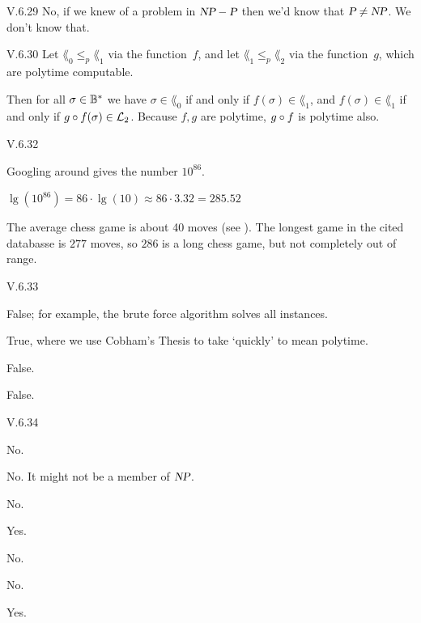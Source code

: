 %
\begin{ans}{V.6.29}
No, if we knew of a problem in $\textsl{NP}-\textsl{P}$ then we'd know that $\textsl{P}\neq\textsl{NP}$.
We don't know that.
\end{ans}
%
\begin{ans}{V.6.30}
Let $\lang_0\leq_p\lang_1$ via the function~$f$,
and let $\lang_1\leq_p\lang_2$ via the function~$g$,
which are polytime computable.

Then for all $\sigma\in{{\mathbb{B}}^{*}}$ we have
$\sigma\in\lang_0$ if and only if $f(\sigma)\in\lang_1$,
and $f(\sigma)\in\lang_1$ if and only if $\mathord{g\mathbin{\circ} f}(\sigma)\in\mathcal{L}_2$.
Because $f,g$ are polytime, $\mathord{g\mathbin{\circ} f}$ is polytime also.
\end{ans}
%
%
\begin{ans}{V.6.32}
\begin{exparts}
\item Googling around gives the number $10^{86}$.
\item $\lg(10^{86})=86\cdot\lg(10)\approx 86\cdot 3.32=285.52$
\item The average chess game is about 40 moves (see \autocite{SE:Chess}).
The longest game in the cited databasse is $277$ moves, so $286$
is a long chess game, but not completely out of range.
\end{exparts}
\end{ans}
%
\begin{ans}{V.6.33}
\begin{exparts*}
\item False; for example, the brute force algorithm solves all instances.
\item True, where we use Cobham's Thesis to take `quickly' to mean polytime.
\item False.
\item False.
\end{exparts*}
\end{ans}
%
\begin{ans}{V.6.34}
\begin{exparts}
\item No.
\item No.  It might not be a member of $\textsl{NP}$.
\item No.
\item Yes.
\item No.
\item No.
\item Yes.
\end{exparts}
\end{ans}
